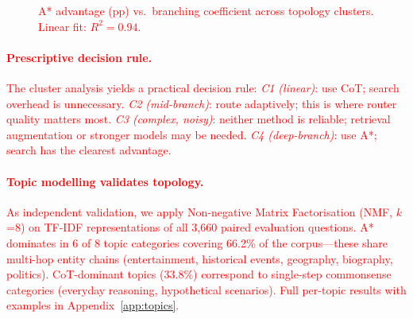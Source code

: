\documentclass[11pt]{article}
\begin{document}
\begin{figure}[t]
\centering
\textcolor{red}{
}
\caption{\textcolor{red}{A* advantage (pp) vs.\ branching coefficient across topology clusters. Linear fit: $R^2=0.94$.}}
\label{fig:topology_scatter}
\end{figure}

\textcolor{red}{\paragraph{Prescriptive decision rule.}
The cluster analysis yields a practical decision rule: \emph{C1 (linear)}: use CoT; search overhead is unnecessary. \emph{C2 (mid-branch)}: route adaptively; this is where router quality matters most. \emph{C3 (complex, noisy)}: neither method is reliable; retrieval augmentation or stronger models may be needed. \emph{C4 (deep-branch)}: use A*; search has the clearest advantage.}

\textcolor{red}{\paragraph{Topic modelling validates topology.}
As independent validation, we apply Non-negative Matrix Factorisation (NMF, $k$=8) on TF-IDF representations of all 3,660 paired evaluation questions. A* dominates in 6 of 8 topic categories covering 66.2\% of the corpus---these share multi-hop entity chains (entertainment, historical events, geography, biography, politics). CoT-dominant topics (33.8\%) correspond to single-step commonsense categories (everyday reasoning, hypothetical scenarios). Full per-topic results with examples in Appendix~\ref{app:topics}.}
\end{document}
